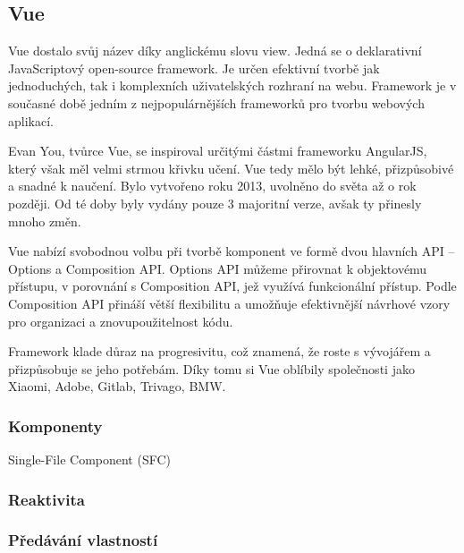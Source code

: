 \subsection{Vue}


Vue dostalo svůj název díky anglickému slovu view. Jedná se o deklarativní JavaScriptový open-source framework. 
Je určen efektivní tvorbě jak jednoduchých, tak i komplexních uživatelských rozhraní na webu. 
Framework je v současné době jedním z nejpopulárnějších frameworků pro tvorbu webových aplikací.\cite{vuemacrae,vue}

Evan You, tvůrce Vue, se inspiroval určitými částmi frameworku AngularJS, který však měl velmi strmou křivku učení. 
Vue tedy mělo být lehké, přizpůsobivé a snadné k naučení. Bylo vytvořeno roku 2013, uvolněno do světa až o rok později. 
Od té doby byly vydány pouze 3 majoritní verze, avšak ty přinesly mnoho změn.\cite{vueflexiple,vuemedium}

Vue nabízí svobodnou volbu při tvorbě komponent ve formě dvou hlavních API -- Options a Composition API. 
Options API můžeme přirovnat k objektovému přístupu, v porovnání s Composition API, jež využívá funkcionální přístup. 
Podle \cite{vue} Composition API přináší větší flexibilitu a umožňuje efektivnější návrhové vzory pro organizaci a znovupoužitelnost kódu.

Framework klade důraz na progresivitu, což znamená, že roste s vývojářem a přizpůsobuje se jeho potřebám. 
Díky tomu si Vue oblíbily společnosti jako Xiaomi, Adobe, Gitlab, Trivago, BMW.\cite{vuetriodev,vue}

\subsubsection{Komponenty}

Single-File Component (SFC)

\subsubsection{Reaktivita}
\subsubsection{Předávání vlastností}
